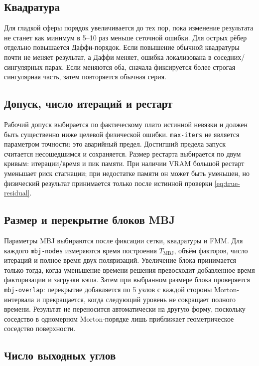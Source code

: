 \documentclass[12pt,a4paper]{article}
\begin{document}
\subsection{Квадратура}

Для гладкой сферы порядок увеличивается до тех пор, пока изменение результата
не станет как минимум в 5--10 раз меньше сеточной ошибки. Для острых рёбер
отдельно повышается Даффи-порядок. Если повышение обычной квадратуры почти не
меняет результат, а Даффи меняет, ошибка локализована в соседних/сингулярных
парах. Если меняются оба, сначала фиксируется более строгая сингулярная часть,
затем повторяется обычная серия.

\subsection{Допуск, число итераций и рестарт}

Рабочий допуск выбирается по фактическому плато истинной невязки и должен быть
существенно ниже целевой физической ошибки. \texttt{max-iters} не является
параметром точности: это аварийный предел. Достигший предела запуск считается
несошедшимся и сохраняется. Размер рестарта выбирается по двум кривым:
итерации/время и пик памяти. При наличии VRAM большой рестарт уменьшает риск
стагнации; при недостатке памяти он может быть уменьшен, но физический результат
принимается только после истинной проверки \eqref{eq:true-residual}.

\subsection{Размер и перекрытие блоков MBJ}

Параметры MBJ выбираются после фиксации сетки, квадратуры и FMM. Для каждого
\texttt{mbj-nodes} измеряются время построения $T_{\mathrm{MBJ}}$, объём
факторов, число итераций и полное время двух поляризаций. Увеличение блока
принимается только тогда, когда уменьшение времени решения превосходит
добавленное время факторизации и загрузки кэша. Затем при выбранном размере
блока проверяется \texttt{mbj-overlap}: перекрытие добавляется по 5 узлов с
каждой стороны Morton-интервала и прекращается, когда следующий уровень не
сокращает полного времени. Результат не переносится автоматически на другую
форму, поскольку соседство в одномерном Morton-порядке лишь приближает
геометрическое соседство поверхности.

\subsection{Число выходных углов}
\end{document}
